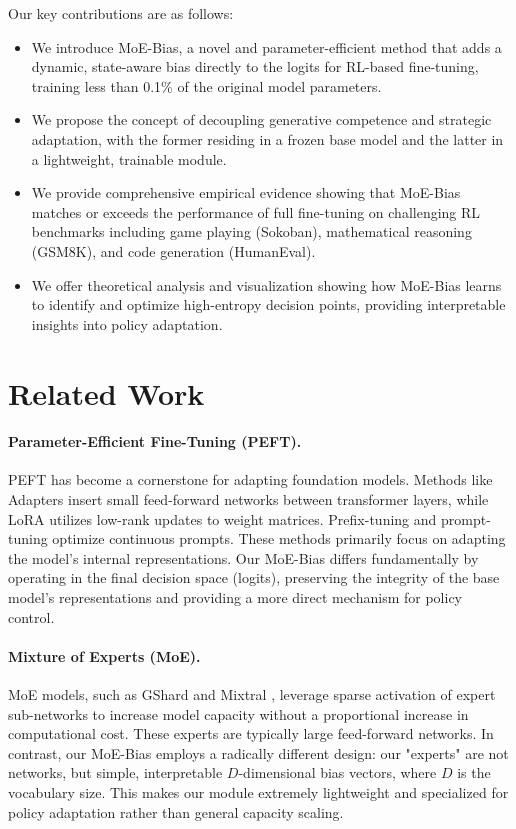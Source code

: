 \documentclass{article}
\begin{document}
Our key contributions are as follows:
\begin{itemize}
    \item We introduce MoE-Bias, a novel and parameter-efficient method that adds a dynamic, state-aware bias directly to the logits for RL-based fine-tuning, training less than 0.1\% of the original model parameters.
    \item We propose the concept of decoupling generative competence and strategic adaptation, with the former residing in a frozen base model and the latter in a lightweight, trainable module.
    \item We provide comprehensive empirical evidence showing that MoE-Bias matches or exceeds the performance of full fine-tuning on challenging RL benchmarks including game playing (Sokoban), mathematical reasoning (GSM8K), and code generation (HumanEval).
    \item We offer theoretical analysis and visualization showing how MoE-Bias learns to identify and optimize high-entropy decision points, providing interpretable insights into policy adaptation.
\end{itemize}


\section{Related Work}

\paragraph{Parameter-Efficient Fine-Tuning (PEFT).}
PEFT has become a cornerstone for adapting foundation models. Methods like Adapters \citep{houlsby2019parameter} insert small feed-forward networks between transformer layers, while LoRA \citep{hu2021lora} utilizes low-rank updates to weight matrices. Prefix-tuning \citep{li2021prefix} and prompt-tuning \citep{lester2021power} optimize continuous prompts. These methods primarily focus on adapting the model's internal representations. Our MoE-Bias differs fundamentally by operating in the final decision space (logits), preserving the integrity of the base model's representations and providing a more direct mechanism for policy control.

\paragraph{Mixture of Experts (MoE).}
MoE models, such as GShard \citep{lepikhin2021gshard} and Mixtral \citep{jiang2024mixtral}, leverage sparse activation of expert sub-networks to increase model capacity without a proportional increase in computational cost. These experts are typically large feed-forward networks. In contrast, our MoE-Bias employs a radically different design: our "experts" are not networks, but simple, interpretable $D$-dimensional bias vectors, where $D$ is the vocabulary size. This makes our module extremely lightweight and specialized for policy adaptation rather than general capacity scaling.
\end{document}
